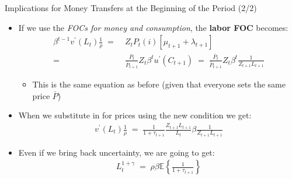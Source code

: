 \documentclass[10pt,c,aspectratio=1610,handout]{beamer}
\begin{document}
\begin{frame}{Implications for Money Transfers at the Beginning of the Period (2/2)}%
  \begin{itemize}%
    \item[$\blacktriangleright$] If we use the \emph{FOCs for money and consumption}, the \textbf{labor FOC} becomes:%
    \begin{align*}%
      \beta^{t-1} v^{\prime} \left(L_{t}\right) \frac{1}{\rho} \; = & \; Z_{t} P_{t}(i) \left[ \mu_{t+1}+\lambda_{t+1} \right]\\%
      = & \; \frac{\bar{P}_{t}}{\bar{P}_{t+1}} Z_{t} \beta^{t} u^{\prime}(C_{t+1}) \; = \; \frac{\bar{P}_{t}}{\bar{P}_{t+1}} Z_{t} \beta^{t} \frac{1}{ Z_{t+1} L_{t+1} }%
    \end{align*}%
    \vspace*{-0.2in}%
    \begin{itemize}%
      \item[$\rightarrow$] This is the same equation as before (given that everyone sets the same price $\bar{P}$)%
    \end{itemize}%
    \vspace*{0.1in}%
    \pause%
    \item[$\blacktriangleright$] When we substitute in for prices using the new condition we get:%
    \begin{align*}%
      v^{\prime} \left(L_{t}\right) \frac{1}{\rho} \; = \; \frac{1}{1+\tau_{t+1}} \frac{Z_{t+1}L_{t+1}}{L_{t}} \beta \frac{1}{Z_{t+1}L_{t+1}}%
    \end{align*}%
    \pause%
    \item[$\blacktriangleright$] Even if we bring back uncertainty, we are going to get:%
    \begin{align*}%
      L_t^{1+\gamma} \; = \; \rho \beta \mathbb{E} \left\{ \frac{1}{1+\tau_{t+1}} \right\}%
    \end{align*}%
  \end{itemize}%
\end{frame}%
\end{document}
